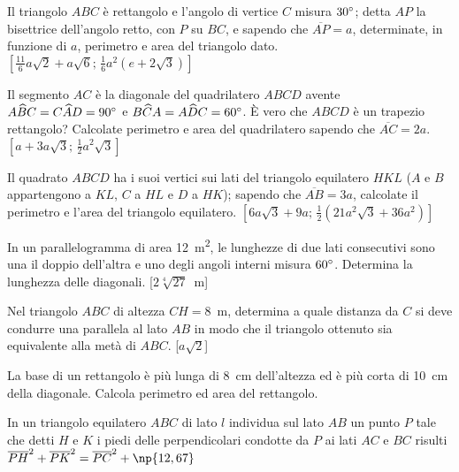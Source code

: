 \begin{multicols}{2}
\begin{esercizio}
\label{ese:7.34}
Il triangolo $ABC$ è rettangolo e l'angolo di vertice $C$ misura $30{}^{\circ}$; detta $AP$ la bisettrice dell'angolo retto, con $P$ su $BC$, e sapendo che $\overline{AP}=a$, determinate, in funzione di $a$, perimetro e area del triangolo dato. 
$\left[\frac{11}{6}a\sqrt{2}+a\sqrt{6}\text{; }\frac{1}{6}a^2(e+2\sqrt{3})\right]$
\end{esercizio}

\begin{esercizio}
\label{ese:7.35}
Il segmento $AC$ è la diagonale del quadrilatero $ABCD$ avente $A\widehat{B}C=C\widehat{A}D=90{}^{\circ}$ e $B\widehat{C}A=A\widehat{D}C=60{}^{\circ}$. \`E vero che $ABCD$ è un trapezio rettangolo? Calcolate perimetro e area del quadrilatero sapendo che $\overline{AC}=2a$.
$\left[a+3a\sqrt{3}\text{; }\frac{1}{2}a^2\sqrt{3}\right]$
\end{esercizio}

\begin{esercizio}
\label{ese:7.36}
Il quadrato $ABCD$ ha i suoi vertici sui lati del triangolo equilatero $HKL$ ($A$ e $B$ appartengono a $KL$, $C$ a $HL$ e $D$ a $HK$); sapendo che $\overline{AB}=3a$, calcolate il perimetro e l'area del triangolo equilatero.
$\left[6a\sqrt{3}+9a\text{; }\frac{1}{2}(21a^2\sqrt{3}+36a^2)\right]$
\end{esercizio}

\begin{esercizio}
\label{ese:7.37}
In un parallelogramma di area 12~m\textsuperscript{2}, le lunghezze di due lati consecutivi sono una il doppio dell'altra e uno degli angoli interni misura $60{}^{\circ}$. Determina la lunghezza delle diagonali. [$2\sqrt[4]{27}$~m]
\end{esercizio}

\begin{esercizio}
\label{ese:7.38}
Nel triangolo $ABC$ di altezza $CH=8$~m, determina a quale distanza da $C$ si deve condurre una parallela al lato $AB$ in modo che il triangolo ottenuto sia equivalente alla metà di $ABC$. [$a\sqrt{2}$]
\end{esercizio}

\begin{esercizio}
\label{ese:7.39}
La base di un rettangolo è più lunga di 8~cm dell'altezza ed è più corta di 10~cm della diagonale. Calcola perimetro ed area del rettangolo. 			
\end{esercizio}

\begin{esercizio}
\label{ese:7.40}
In un triangolo equilatero $ABC$ di lato $l$ individua sul lato $AB$ un punto $P$ tale che detti $H$ e $K$ i piedi delle perpendicolari condotte da $P$ ai lati $AC$ e $BC$ risulti $\overline{PH}^2+\overline{PK}^2=\overline{PC}^2+\np{12,67}$
\end{esercizio}


\end{multicols}
